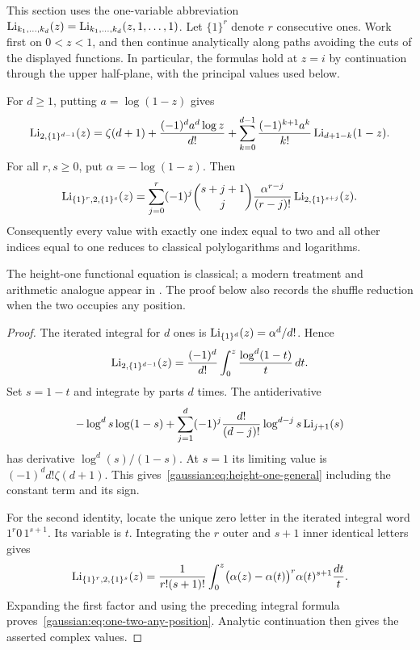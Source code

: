 This section uses the one-variable abbreviation
$\operatorname{Li}_{k_1,\ldots,k_d}(z)=\operatorname{Li}_{k_1,\ldots,k_d}(z,1,\ldots,1)$.
Let $\{1\}^{r}$ denote $r$ consecutive ones. Work first on $0<z<1$, and
then continue analytically along paths avoiding the cuts of the displayed
functions. In particular, the formulas hold at $z=i$ by continuation
through the upper half-plane, with the principal values used below.

\begin{theorem}\label{gaussian:thm:one-two}
For $d\ge1$, putting $a=\log(1-z)$ gives
\begin{equation}\label{gaussian:eq:height-one-general}
 \operatorname{Li}_{2,\{1\}^{d-1}}(z)
 =\zeta(d+1)+\frac{(-1)^d a^d\log z}{d!}
   +\sum_{k=0}^{d-1}\frac{(-1)^{k+1}a^k}{k!}
                       \operatorname{Li}_{d+1-k}(1-z).
\end{equation}
For all $r,s\ge0$, put $\alpha=-\log(1-z)$. Then
\begin{equation}\label{gaussian:eq:one-two-any-position}
 \operatorname{Li}_{\{1\}^{r},2,\{1\}^{s}}(z)
 =\sum_{j=0}^{r}(-1)^j\binom{s+j+1}{j}
      \frac{\alpha^{r-j}}{(r-j)!}
                     \operatorname{Li}_{2,\{1\}^{s+j}}(z).
\end{equation}
Consequently every value with exactly one index equal to two and all other
indices equal to one reduces to classical polylogarithms and logarithms.
\end{theorem}

The height-one functional equation is classical; a modern treatment and
arithmetic analogue appear in \cite{gaussian:NakamuraShiraishi}. The proof below
also records the shuffle reduction when the two occupies any position.

\begin{proof}
The iterated integral for $d$ ones is
$\operatorname{Li}_{\{1\}^{d}}(z)=\alpha^d/d!$. Hence
\[
 \operatorname{Li}_{2,\{1\}^{d-1}}(z)
 =\frac{(-1)^d}{d!}\int_0^z\frac{\log^d(1-t)}{t}\,dt.
\]
Set $s=1-t$ and integrate by parts $d$ times. The antiderivative
\[
 -\log^d s\log(1-s)
  +\sum_{j=1}^{d}(-1)^j\frac{d!}{(d-j)!}
                       \log^{d-j}s\operatorname{Li}_{j+1}(s)
\]
has derivative $\log^d(s)/(1-s)$. At $s=1$ its limiting value is
$(-1)^d d!\zeta(d+1)$. This gives~\eqref{gaussian:eq:height-one-general} including
the constant term and its sign.

For the second identity, locate the unique zero letter in the iterated
integral word $1^r0\,1^{s+1}$. Its variable is $t$. Integrating the
$r$ outer and $s+1$ inner identical letters gives
\[
 \operatorname{Li}_{\{1\}^{r},2,\{1\}^{s}}(z)
 =\frac1{r!(s+1)!}\int_0^z
    \bigl(\alpha(z)-\alpha(t)\bigr)^r\alpha(t)^{s+1}\frac{dt}{t}.
\]
Expanding the first factor and using the preceding integral formula
proves~\eqref{gaussian:eq:one-two-any-position}. Analytic continuation then gives
the asserted complex values.
\end{proof}

